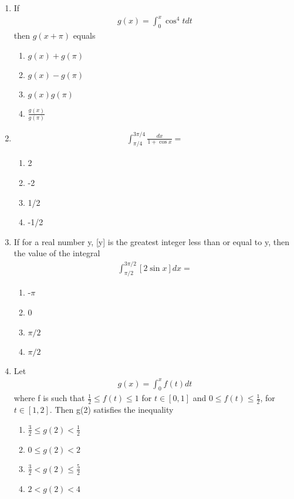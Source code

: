 \begin{enumerate}[label=\arabic*.,ref=\thesubsection.\theenumi]
\item If 
\begin{align*}
g(x) = \int_{0}^{x}\cos^{4}t dt
\end{align*}
then $g(x + \pi)$ equals
\begin{enumerate}
\item $g(x) + g(\pi)$
\item $g(x) - g(\pi)$
\item $g(x)g(\pi)$
\item $\frac{g(x)}{g(\pi)}$
\end{enumerate}

\item
\begin{align*}
\int_{\pi/4}^{3\pi/4}\frac{dx}{1 + \cos x} = 
\end{align*}
\begin{enumerate}
\item 2
\item -2
\item 1/2
\item -1/2
\end{enumerate}

\item If for a real number y, [y] is the greatest integer less than or equal to y, then the value of the integral
\begin{align*}
\int_{\pi/2}^{3\pi/2}[2\sin x]dx = 
\end{align*}
\begin{enumerate}
\item -$\pi$
\item 0
\item $\pi/2$
\item $\pi/2$
\end{enumerate}

\item Let
\begin{align*}
g(x) = \int_{0}^{x}f(t) dt
\end{align*}
where f is such that $\frac{1}{2} \leq f(t) \leq 1$ for $t \in [0, 1]$ and $0 \leq f(t) \leq \frac{1}{2}$, for $t \in [1, 2]$. Then g(2) satisfies the inequality
\begin{enumerate}
\item $\frac{3}{2} \leq g(2) < \frac{1}{2}$
\item $0 \leq g(2) < 2$
\item $\frac{3}{2} < g(2) \leq \frac{5}{2}$
\item $2 < g(2) < 4$
\end{enumerate}


\end{enumerate}
